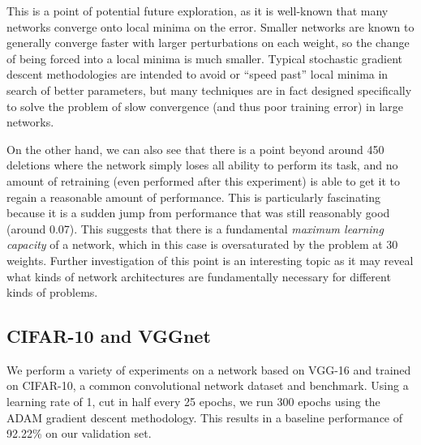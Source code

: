 \documentclass[10pt,twocolumn,letterpaper]{article}
\begin{document}
This is a point of potential future exploration, as it is well-known that many networks converge onto local minima on the error.
Smaller networks are known to generally converge faster with larger perturbations on each weight, so the change of being forced into a local minima is much smaller.
Typical stochastic gradient descent methodologies are intended to avoid or ``speed past'' local minima in search of better parameters, but many techniques are in fact designed specifically to solve the problem of slow convergence (and thus poor training error) in large networks.

On the other hand, we can also see that there is a point beyond around 450 deletions where the network simply loses all ability to perform its task, and no amount of retraining (even performed after this experiment) is able to get it to regain a reasonable amount of performance.
This is particularly fascinating because it is a sudden jump from performance that was still reasonably good (around 0.07).
This suggests that there is a fundamental \emph{maximum learning capacity} of a network, which in this case is oversaturated by the problem at 30 weights.
Further investigation of this point is an interesting topic as it may reveal what kinds of network architectures are fundamentally necessary for different kinds of problems.

\subsection{CIFAR-10 and VGGnet}
We perform a variety of experiments on a network based on VGG-16 and trained on CIFAR-10, a common convolutional network dataset and benchmark.
Using a learning rate of 1, cut in half every 25 epochs, we run 300 epochs using the ADAM gradient descent methodology.
This results in a baseline performance of 92.22\% on our validation set.
\end{document}
